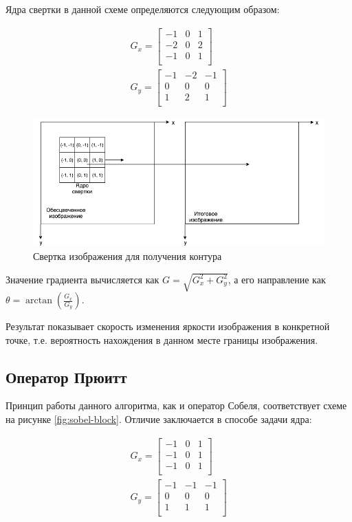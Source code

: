 Ядра свертки в данной схеме определяются следующим образом:

\begin{eqnarray}\label{eq:sobel-matrixs}
G_x = \begin{bmatrix}
-1 & 0 & 1\\
-2 & 0 & 2\\
-1 & 0 & 1\\
\end{bmatrix} \\
G_y = \begin{bmatrix}
-1 & -2 & -1\\
0 & 0 & 0\\
1 & 2 & 1\\
\end{bmatrix}
\end{eqnarray}

\begin{figure}[!h]
	\centering
	\includegraphics[width=\textwidth,keepaspectratio]{figures/ru/sobel.png}
	\caption{Свертка изображения для получения контура}
	\label{fig:sobel}
\end{figure}

Значение градиента вычисляется как $G=\sqrt{G_x^2+G_y^2}$, а его направление как $\theta=\arctan(\frac{G_x}{G_y})$.

Результат показывает скорость изменения яркости изображения в конкретной точке, т.е. вероятность нахождения в данном месте границы изображения.

\subsection{Оператор Прюитт}

Принцип работы данного алгоритма\cite{Prewitt}, как и оператор Собеля, соответствует схеме на рисунке \ref{fig:sobel-block}. Отличие заключается в способе задачи ядра:

\begin{eqnarray}\label{eq:prewitt-matrixs}
G_x = \begin{bmatrix}
-1 & 0 & 1\\
-1 & 0 & 1\\
-1 & 0 & 1\\
\end{bmatrix} \\
G_y = \begin{bmatrix}
-1 & -1 & -1\\
0 & 0 & 0\\
1 & 1 & 1\\
\end{bmatrix}
\end{eqnarray}


